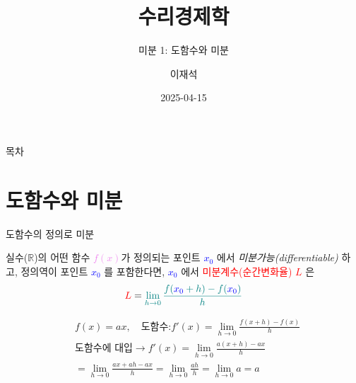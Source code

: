 \documentclass[aspectratio=169]{beamer}
\title{수리경제학}
\subtitle{미분 1: 도함수와 미분}
\author{이재석}
\date{2025-04-15}
\begin{document}
\begin{frame}
  \titlepage
\end{frame}

\begin{frame}{목차}
  \tableofcontents
\end{frame}




\section{도함수와 미분}
\begin{frame}{도함수의 정의로 미분}
  \begin{definition}[도함수]
    실수($\mathbb{R}$)의 어떤 함수 \textcolor{violet}{$f(x)$}가 정의되는 포인트 \textcolor{blue}{\emph{$x_0$}} 에서 \emph{미분가능(differentiable)} 하고, 정의역이 포인트 \textcolor{blue}{\emph{$x_0$}} 를 포함한다면, \textcolor{blue}{\emph{$x_0$}} 에서 \textcolor{red}{미분계수(순간변화율)} \textcolor{red}{\emph{$L$}} 은 \\
    \begin{equation}
      \textcolor{red}{L} = \textcolor{teal}{\lim_{h \to 0} \frac{f(\textcolor{blue}{x_0}+h)-f(\textcolor{blue}{x_0})}{h}}
    \end{equation}
  \end{definition}
  \begin{align*}
    & f(x) = ax, \quad \text{도함수:} f'(x) = \lim_{h \to 0} \frac{f(x+h)-f(x)}{h} \\
    & \text{도함수에 대입} \rightarrow f'(x) = \lim_{h \to 0} \frac{a(x+h)-ax}{h} \\
    & = \lim_{h \to 0} \frac{ax + ah -ax}{h} = \lim_{h \to 0} \frac{ah}{h} = \lim_{h \to 0} a = a\\
  \end{align*}
\end{frame}
\end{document}
